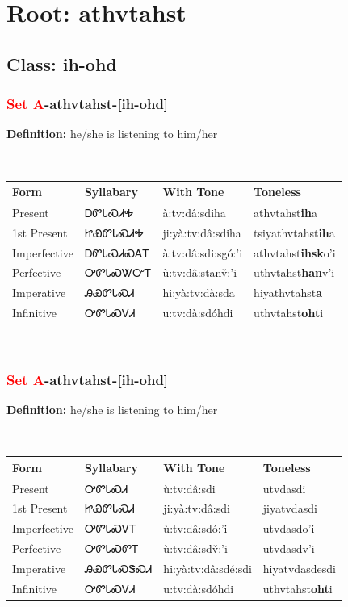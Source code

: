 \needspace{4in}
\section*{Root: athvtahst}
\nopagebreak
{}
\needspace{3in}
\subsection*{Class: ih-ohd}
\nopagebreak
\needspace{2in}
\subsubsection*{\textcolor{Red}{Set A}{-}\textbf{athvtahst}{-}[ih-ohd]}
\nopagebreak
\textbf{Definition: } he/she is listening to him/her
\\[0.5em]
\begin{tabularx}{\textwidth}{l X X X}%
\toprule%
\textbf{Form}&\textbf{Syllabary}&\textbf{With Tone}&\textbf{Toneless}\\%
\midrule%
Present&ᎠᏛᏓᏍᏗᎭ&à:tv:dâ:sdiha&athvtahst\textbf{ih}a\\%
1st Present&ᏥᏯᏛᏓᏍᏗᎭ&ji:yà:tv:dâ:sdiha&tsiyathvtahst\textbf{ih}a\\%
Imperfective&ᎠᏛᏓᏍᏗᏍᎪᎢ&à:tv:dâ:sdi:sgó:’i&athvtahst\textbf{ihsk}o'i\\%
Perfective&ᎤᏛᏓᏍᏔᏅᎢ&ù:tv:dâ:stanv̌:’i&uthvtahst\textbf{han}v'i\\%
Imperative&ᎯᏯᏛᏓᏍᏗ&hi:yà:tv:dà:sda&hiyathvtahst\textbf{a}\\%
Infinitive&ᎤᏛᏓᏍᏙᏗ&u:tv:dà:sdóhdi&uthvtahst\textbf{oht}i\\%
\bottomrule%
\end{tabularx}
\\[1em]
\needspace{2in}
\subsubsection*{\textcolor{Red}{Set A}{-}\textbf{athvtahst}{-}[ih-ohd]}
\nopagebreak
\textbf{Definition: } he/she is listening to him/her
\\[0.5em]
\begin{tabularx}{\textwidth}{l X X X}%
\toprule%
\textbf{Form}&\textbf{Syllabary}&\textbf{With Tone}&\textbf{Toneless}\\%
\midrule%
Present&ᎤᏛᏓᏍᏗ&ù:tv:dâ:sdi&utvdasdi\\%
1st Present&ᏥᏯᏛᏓᏍᏗ&ji:yà:tv:dâ:sdi&jiyatvdasdi\\%
Imperfective&ᎤᏛᏓᏍᏙᎢ&ù:tv:dâ:sdó:’i&utvdasdo{\textquoteright}i\\%
Perfective&ᎤᏛᏓᏍᏛᎢ&ù:tv:dâ:sdv̌:’i&utvdasdv{\textquoteright}i\\%
Imperative&ᎯᏯᏛᏓᏍᏕᏍᏗ&hi:yà:tv:dâ:sdé:sdi&hiyatvdasdesdi\\%
Infinitive&ᎤᏛᏓᏍᏙᏗ&u:tv:dà:sdóhdi&uthvtahst\textbf{oht}i\\%
\bottomrule%
\end{tabularx}
\\[1em]